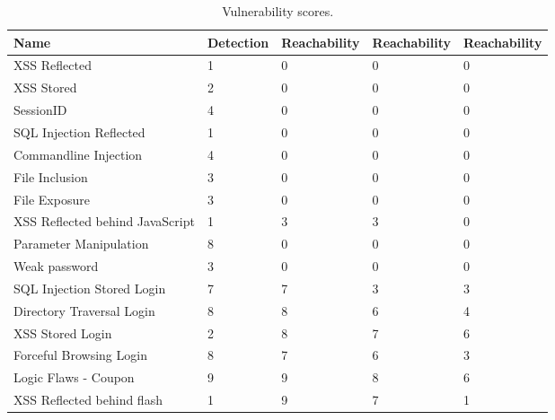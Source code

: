  \begin{table}[t]
      {\scriptsize
        \begin{tabular}{|p{25ex}|l|p{12ex}|p{12ex}|p{12ex}|}
          \hline
          Name                             &  Detection  &  \initial{} Reachability  &  \config{} Reachability  &  \manual{} Reachability  \\
          \hline
          XSS Reflected                    &       1  &             0  &            0  &            0  \\
          XSS Stored                       &       2  &             0  &            0  &            0  \\
          SessionID                        &       4  &             0  &            0  &            0  \\
          SQL Injection Reflected          &       1  &             0  &            0  &            0  \\
          Commandline Injection            &       4  &             0  &            0  &            0  \\
          File Inclusion                   &       3  &             0  &            0  &            0  \\
          File Exposure                    &       3  &             0  &            0  &            0  \\
          \parbox[t]{25ex}{\raggedright XSS Reflected behind JavaScript}  &       1  &             3  &            3  &            0  \\
          Parameter Manipulation           &       8  &             0  &            0  &            0  \\
          Weak password                    &       3  &             0  &            0  &            0  \\
          SQL Injection Stored Login       &       7  &             7  &            3  &            3  \\
          Directory Traversal Login        &       8  &             8  &            6  &            4  \\
          XSS Stored Login                 &       2  &             8  &            7  &            6  \\
          Forceful Browsing Login          &       8  &             7  &            6  &            3  \\
          Logic Flaws - Coupon             &       9  &             9  &            8  &            6  \\
          XSS Reflected behind flash       &       1  &             9  &            7  &            1  \\
          \hline
      \end{tabular}}
      \caption{Vulnerability scores.}
      \label{vulnscores}
  \end{table}
